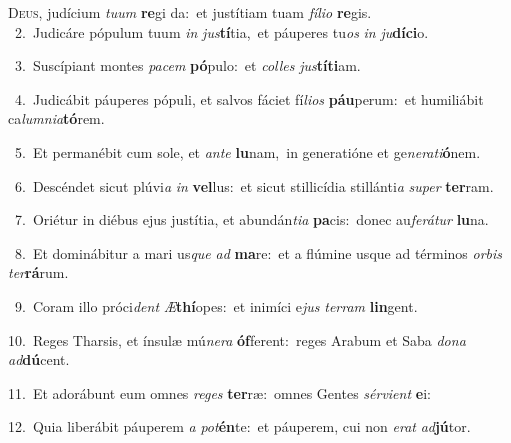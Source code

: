\lettrine{\initial\textcolor{\initialcolor}{D}}{eus,} judícium \textit{tu}\-\textit{um} \textbf{re}\-gi da:~\star et justítiam tuam \textit{fí}\-\textit{li}\textit{o} \textbf{re}\-gis.\\
{\numbfont\textcolor{\numbcolor}{~2.}}~Judicáre pópulum tuum \textit{in} \textit{jus}\-\textbf{tí}tia,~\star et páuperes tu\textit{os} \textit{in} \textit{ju}\-\textbf{dí}\textbf{ci}o.\par
{\numbfont\textcolor{\numbcolor}{~3.}}~Suscípiant montes \textit{pa}\-\textit{cem} \textbf{pó}\-pulo:~\star et \textit{col}\-\textit{les} \textit{jus}\-\textbf{tí}\textbf{ti}am.\par
{\numbfont\textcolor{\numbcolor}{~4.}}~Judicábit páuperes pópuli, et salvos fáciet fí\-\textit{li}\-\textit{os} \textbf{páu}\-perum:~\star et humiliábit ca\-\textit{lum}\-\textit{ni}\textit{a}\textbf{tó}rem.\par
{\numbfont\textcolor{\numbcolor}{~5.}}~Et permanébit cum sole, et \textit{an}\-\textit{te} \textbf{lu}\-nam,~\star in generatióne et ge\-\textit{ne}\-\textit{ra}\textit{ti}\textbf{ó}nem.\par
{\numbfont\textcolor{\numbcolor}{~6.}}~Descéndet sicut plúvi\textit{a} \textit{in} \textbf{vel}\-lus:~\star et sicut stillicídia stillánti\textit{a} \textit{su}\-\textit{per} \textbf{ter}\-ram.\par
{\numbfont\textcolor{\numbcolor}{~7.}}~Oriétur in diébus ejus justítia, et abundán\-\textit{ti}\-\textit{a} \textbf{pa}\-cis:~\star donec au\-\textit{fe}\-\textit{rá}\textit{tur} \textbf{lu}\-na.\par
{\numbfont\textcolor{\numbcolor}{~8.}}~Et dominábitur a mari us\textit{que} \textit{ad} \textbf{ma}\-re:~\star et a flúmine usque ad términos \textit{or}\-\textit{bis} \textit{ter}\-\textbf{rá}rum.\par
{\numbfont\textcolor{\numbcolor}{~9.}}~Coram illo próci\textit{dent} \textit{Æ}\-\textbf{thí}opes:~\star et inimíci e\textit{jus} \textit{ter}\-\textit{ram} \textbf{lin}\-gent.\par
{\numbfont\textcolor{\numbcolor}{10.}}~Reges Tharsis, et ínsulæ mú\-\textit{ne}\-\textit{ra} \textbf{óf}\-ferent:~\star reges Arabum et Saba \textit{do}\-\textit{na} \textit{ad}\-\textbf{dú}cent.\par
{\numbfont\textcolor{\numbcolor}{11.}}~Et adorábunt eum omnes \textit{re}\-\textit{ges} \textbf{ter}\-ræ:~\star omnes Gentes \textit{sér}\-\textit{vi}\textit{ent} \textbf{e}\-i:\par
{\numbfont\textcolor{\numbcolor}{12.}}~Quia liberábit páuperem \textit{a} \textit{pot}\-\textbf{én}te:~\star et páuperem, cui non \textit{e}\-\textit{rat} \textit{ad}\-\textbf{jú}tor.\par
